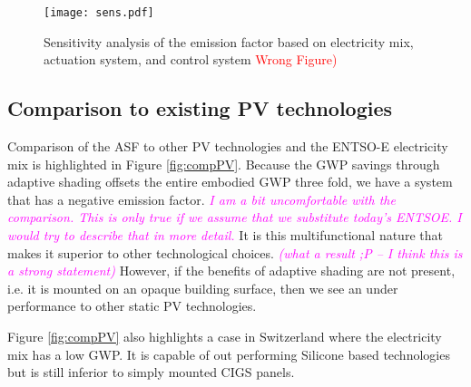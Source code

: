 



\begin{figure}[H]
\begin{center}
\texttt{[image: sens.pdf]}
\caption{Sensitivity analysis of the emission factor based on electricity mix, actuation system, and control system \textcolor{red}{Wrong Figure)}}
\label{fig:sens}
\end{center}
\end{figure}

\subsection{Comparison to existing PV technologies}

Comparison of the ASF to other PV technologies and the ENTSO-E electricity mix is highlighted in Figure \ref{fig:compPV}. Because the GWP savings through adaptive shading offsets the entire embodied GWP three fold, we have a system that has a negative emission factor. \textcolor{magenta}{\textit{I am a bit uncomfortable with the comparison. This is only true if we assume that we substitute today's ENTSOE. I would try to describe that in more detail.}} It is this multifunctional nature that makes it superior to other technological choices. \textcolor{magenta}{\textit{(what a result ;P -- I think this is a strong statement)}} However, if the benefits of adaptive shading are not present, i.e. it is mounted on an opaque building surface, then we see an under performance to other static PV technologies. 

Figure \ref{fig:compPV} also highlights a case in Switzerland where the electricity mix has a low GWP. It is capable of out performing Silicone based technologies but is still inferior to simply mounted CIGS panels. 

